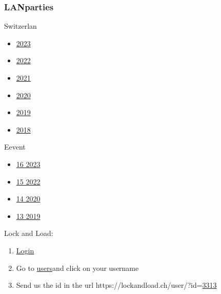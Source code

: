 \documentclass{article}
\begin{document}
\subsubsection{LANparties}
Switzerlan
\begin{itemize}
    \item \href{https://battlefy.com/switzerlan-2023/switzerlan-2023-counter-strike-2/65293e1a490b280d6f6adcb0/participants}{2023}
    \item \href{https://battlefy.com/switzerlan-2022/switzerlan-2022-csgo/634937c11ecc2379690e86f8/participants}{2022}
    \item \href{https://battlefy.com/switzerlan-2021/switzerlan-2021-csgo/613e02153a882b30a4149fc3/participants}{2021}
    \item \href{https://battlefy.com/switzerlan-2020/switzerlan-2020-csgo/5f806e118f28e0606c16e93a/participants}{2020}
    \item \href{https://battlefy.com/switzerlan-2019/csgo-5on5-main-tournament/5dd7f3c10f8e011abc0fd63f/participants}{2019}
    \item \href{https://battlefy.com/switzerlan-2018/csgo-5on5-main-tournament/5bb561bd0983dd03b26db586/participants}{2018}
\end{itemize}
Eevent
\begin{itemize}
    \item \href{https://16.eevent.ch/turnier/?do=teilnehmer&id=268}{16 2023}
    \item \href{https://15.eevent.ch/turnier/?do=teilnehmer&id=244}{15 2022}
    \item \href{https://14.eevent.ch/turnier/?do=teilnehmer&id=188}{14 2020}
    \item \href{https://13.eevent.ch/turnier/?do=teilnehmer&id=149}{13 2019}
\end{itemize}
Lock and Load:
\begin{enumerate}
 \item \href{https://lockandload.ch/user/?do=login}{Login}
 \item Go to \href{https://lockandload.ch/online/}{users}and click on your username
 \item Send us the id in the url https://lockandload.ch/user/?id=\underline{3313}
\end{enumerate}
\end{document}
